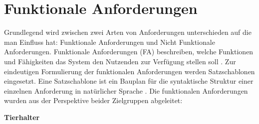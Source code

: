 \section{Funktionale Anforderungen}

Grundlegend wird zwischen zwei Arten von Anforderungen unterschieden auf die man Einfluss hat: Funktionale Anforderungen und Nicht Funktionale Anforderungen. Funktionale Anforderungen (FA) beschreiben, welche Funktionen und Fähigkeiten das System den Nutzenden zur Verfügung stellen soll \cite[S.~3]{pohl2021}. Zur eindeutigen Formulierung der funktionalen Anforderungen werden 
Satzschablonen eingesetzt. Eine Satzschablone ist ein Bauplan für die 
syntaktische Struktur einer einzelnen Anforderung in natürlicher Sprache 
\cite[S.~71]{pohl2021}. Die funktionalen Anforderungen wurden aus der 
Perspektive beider Zielgruppen abgeleitet:

\textbf{Tierhalter}

